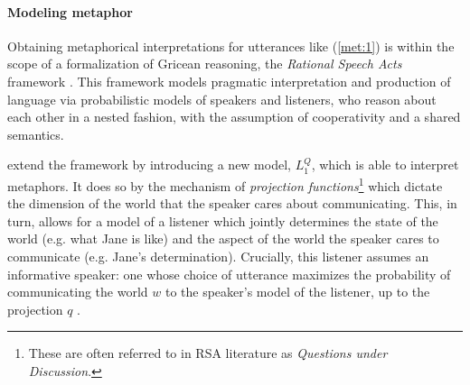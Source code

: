 \documentclass[OpenMind]{stjour}
\newcommand{\Listener}{L}
\newcommand{\QLONE}{\Listener_{{1}}^{{Q}}}
\begin{document}
	\paragraph{Modeling metaphor}
	Obtaining metaphorical interpretations for utterances like (\ref{met:1}) is within the scope of a formalization of Gricean reasoning, the \emph{Rational Speech Acts} framework \citep{goodman}. This framework models pragmatic interpretation and production of language via probabilistic models of speakers and listeners, who reason about each other in a nested fashion, with the assumption of cooperativity and a shared semantics.






	\citet{kao} extend the framework by introducing a new model, $\QLONE$, which is able to interpret metaphors. It does so by the mechanism of \emph{projection functions}\footnote{These are often referred to in RSA literature as \emph{Questions under Discussion}.} which dictate the dimension of the world that the speaker cares about communicating. This, in turn, allows for a model of a listener which jointly determines the state of the world (e.g. what Jane is like) and the aspect of the world the speaker cares to communicate (e.g. Jane's determination). Crucially, this listener assumes an informative speaker: one whose choice of utterance maximizes the probability of communicating the world $w$ to the speaker's model of the listener, up to the projection $q$ .
	
\end{document}
